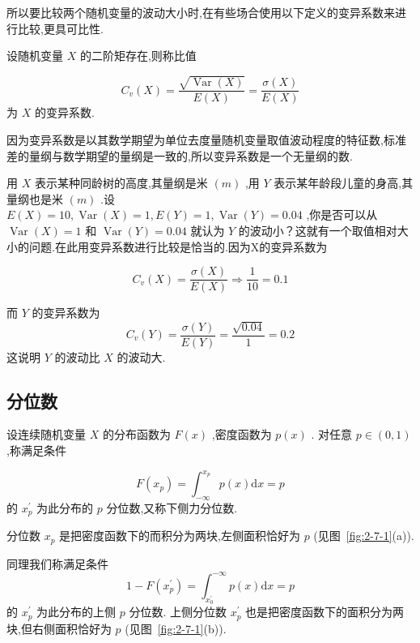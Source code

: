 所以要比较两个随机变量的波动大小时,在有些场合使用以下定义的变异系数来进行比较,更具可比性.

\begin{definition}{}{}
	设随机变量 $ X $ 的二阶矩存在,则称比值
	
	\begin{equation}
	C_{v}(X)=\frac{\sqrt{\operatorname{Var}(X)}}{E(X)}=\frac{\sigma(X)}{E(X)} \label{eq:2.7.3}
	\end{equation}
	为 $ X $ 的变异系数.
\end{definition}

因为变异系数是以其数学期望为单位去度量随机变量取值波动程度的特征数,标准差的量纲与数学期望的量纲是一致的,所以变异系数是一个无量纲的数.

\begin{example}
	用 $ X $ 表示某种同龄树的高度,其量纲是米 $ (m) $ ,用 $ Y $ 表示某年龄段儿童的身高,其量纲也是米 $ (m) $ .设 $ E(X)=10, \operatorname{Var}(X)=1, E(Y)=1, \operatorname{Var}(Y)=0.04 $ ,你是否可以从 $ \operatorname{Var}(X)=1 $ 和 $ \operatorname{Var}(Y)=0.04 $ 就认为 $ Y $ 的波动小？这就有一个取值相对大小的问题.在此用变异系数进行比较是恰当的.因为X的变异系数为
	
	\[
	C_{v}(X)=\frac{\sigma(X)}{E(X)} \Rightarrow \frac{1}{10}=0.1
	\]
	
	而 $ Y $ 的变异系数为
	\[
	C_{v}(Y)=\frac{\sigma(Y)}{E(Y)}=\frac{\sqrt{0.04}}{1}=0.2
	\]
	这说明 $ Y $ 的波动比 $ X $ 的波动大.
\end{example}

\subsection{分位数}

\begin{definition}{}{}
	设连续随机变量 $ X $ 的分布函数为 $ F(x) $ ,密度函数为 $ p(x) $ .
	对任意 $ p \in(0,1) $ ,称满足条件
	
	\begin{equation}
	F\left(x_{p}\right)=\int_{-\infty}^{x_{p}} p(x) \mathrm{d} x=p \label{eq:2.7.4}
	\end{equation}
	的 $ x_{p}^{\prime} $ 为此分布的 $ p $ 分位数,又称下侧力分位数.
	
	分位数 $ x_{p} $ 是把密度函数下的而积分为两块,左侧面积恰好为 $ p $ (见图~\ref{fig:2-7-1}(a)).
	
	同理我们称满足条件
	\begin{equation}
	1-F\left(x_{p}^{\prime}\right)=\int_{x_{0}^{\prime}}^{-\infty} p(x) \mathrm{d} x=p \label{eq:2.7.5}
	\end{equation}
	的 $ x_{p}^{\prime} $ 为此分布的上侧 $ p $ 分位数.
	上侧分位数 $ x_{p}^{\prime} $ 也是把密度函数下的面积分为两块,但右侧面积恰好为 $ p $ (见图~\ref{fig:2-7-1}(b)).
\end{definition}

